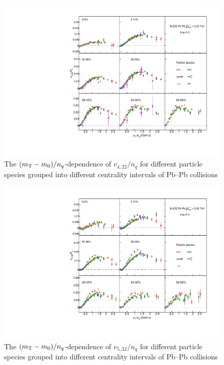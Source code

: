 \documentclass[ALICE,manyauthors]{cernphprep}
\begin{document}
\begin{figure}[htb]
\begin{center}
\includegraphics[scale=0.82]{figures/scaling/All_v422_gap00_KET_3by3.pdf}

\end{center}
\caption{The $(m_{\rm{T}} - m_{0})/n_{q}$-dependence of $v_{4,22}/n_{q}$ for different particle species grouped into different centrality intervals of Pb--Pb collisions \sNN}
\label{v422_KET}
\end{figure}

\begin{figure}[htb]
\begin{center}
\includegraphics[scale=0.82]{figures/scaling/All_v523_gap00_KET_3by3.pdf}

\end{center}
\caption{The $(m_{\rm{T}} - m_{0})/n_{q}$-dependence of $v_{5,32}/n_{q}$ for different particle species grouped into different centrality intervals of Pb--Pb collisions \sNN}
\label{v523_KET}
\end{figure}
\end{document}
